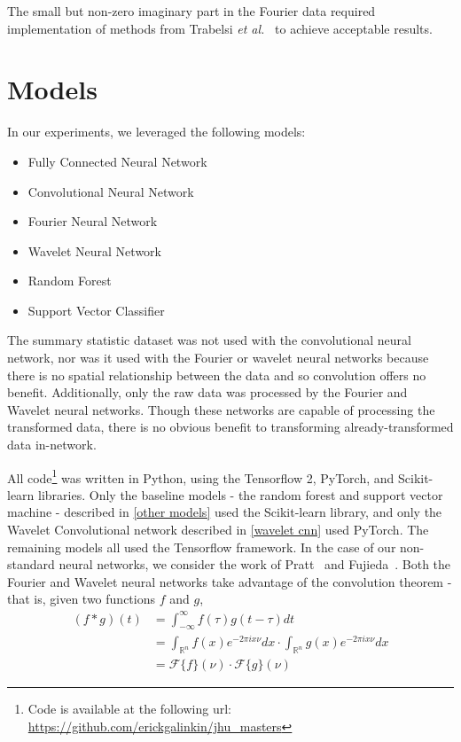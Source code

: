 \renewcommand{\thefootnote}{1}
The small but non-zero imaginary part in the Fourier data required implementation of methods from Trabelsi \textit{et al.}~\cite{trabelsi2017deep} to achieve acceptable results.

\section{Models}\label{model_descriptions}
In our experiments, we leveraged the following models:
\begin{itemize}
\item Fully Connected Neural Network
\item Convolutional Neural Network
\item Fourier Neural Network
\item Wavelet Neural Network
\item Random Forest
\item Support Vector Classifier	
\end{itemize}

The summary statistic dataset was not used with the convolutional neural network, nor was it used with the Fourier or wavelet neural networks because there is no spatial relationship between the data and so convolution offers no benefit.
Additionally, only the raw data was processed by the Fourier and Wavelet neural networks.
Though these networks are capable of processing the transformed data, there is no obvious benefit to transforming already-transformed data in-network.

All code\footnote{Code is available at the following url: \url{https://github.com/erickgalinkin/jhu_masters}} was written in Python, using the Tensorflow 2, PyTorch, and Scikit-learn libraries.
Only the baseline models - the random forest and support vector machine - described in \ref{other models} used the Scikit-learn library, and only the Wavelet Convolutional network described in \ref{wavelet cnn} used PyTorch.
The remaining models all used the Tensorflow framework.
In the case of our non-standard neural networks, we consider the work of Pratt~\cite{pratt2017fcnn} and Fujieda~\cite{fujieda2017wavelet}.
Both the Fourier and Wavelet neural networks take advantage of the convolution theorem - that is, given two functions $f$ and $g$,
\begin{align*}
(f * g)(t) & = \int_{-\infty}^{\infty} f(\tau)g(t-\tau)dt \\
& = \int_{\mathbb{R}^n}f(x) e^{-2\pi i x \nu} dx	 \cdot \int_{\mathbb{R}^n}g(x) e^{-2\pi i x \nu} dx\\	
& = \mathcal{F}\{f\}(\nu) \cdot \mathcal{F}\{g\}(\nu)
\end{align*}

